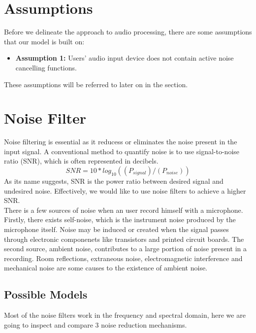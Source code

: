 \section{Assumptions}
Before we delineate the approach to audio processing, there are some assumptions that our model
is built on:
\begin{itemize}
	\item \textbf{Assumption 1:} Users' audio input device does not contain active noise cancelling functions.
\end{itemize}

These assumptions will be referred to later on in the section.

\section{Noise Filter}
Noise filtering is essential as it reducess or eliminates the noise present in the input signal.
A conventional method to quantify noise is to use signal-to-noise ratio (SNR), which is often 
represented in decibels.
\[SNR=10*log_10((P_{signal})/(P_{noise}))\]
As its name suggests, SNR is the power ratio between desired signal and undesired noise. Effectively,
we would like to use noise filters to achieve a higher SNR.\\ 
There is a few sources of noise when an user record himself with a microphone.
Firstly, there exists self-noise, which is the instrument noise produced by the microphone itself.
Noise may be induced or created when the signal passes through electronic componenets like transistors 
and printed circuit boards.\cite{selfnoise} 
The second source, ambient noise, contributes to a large portion of noise present in a recording.
Room reflections, extraneous noise, electromagnetic interference and mechanical noise are some causes 
to the existence of ambient noise. 
\subsection{Possible Models}
Most of the noise filters work in the frequency and spectral domain, here we are going to inspect and
compare 3 noise reduction mechanisms.

